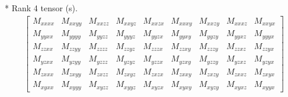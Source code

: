 \documentclass[fleqn,8pt,landscape]{jsarticle}
\begin{document}
* Rank 4 tensor (s).
\begin{align*}
\begin{bmatrix} M_{xxxx} & M_{xxyy} & M_{xxzz} & M_{xxyz} & M_{xxzx} & M_{xxxy} & M_{xxzy} & M_{xxxz} & M_{xxyx} \\ M_{yyxx} & M_{yyyy} & M_{yyzz} & M_{yyyz} & M_{yyzx} & M_{yyxy} & M_{yyzy} & M_{yyxz} & M_{yyyx} \\ M_{zzxx} & M_{zzyy} & M_{zzzz} & M_{zzyz} & M_{zzzx} & M_{zzxy} & M_{zzzy} & M_{zzxz} & M_{zzyx} \\ M_{yzxx} & M_{yzyy} & M_{yzzz} & M_{yzyz} & M_{yzzx} & M_{yzxy} & M_{yzzy} & M_{yzxz} & M_{yzyx} \\ M_{zxxx} & M_{zxyy} & M_{zxzz} & M_{zxyz} & M_{zxzx} & M_{zxxy} & M_{zxzy} & M_{zxxz} & M_{zxyx} \\ M_{xyxx} & M_{xyyy} & M_{xyzz} & M_{xyyz} & M_{xyzx} & M_{xyxy} & M_{xyzy} & M_{xyxz} & M_{xyyx} \end{bmatrix}
\end{align*}
\end{document}
